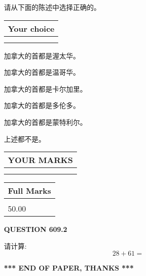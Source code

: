 \documentclass{ctexart}
\begin{document}
  
请从下面的陈述中选择正确的。
  
  
\noindent\hspace{3.0in} \begin{tabular}{|l|}
\hline
Your choice \\
\hline
 \\ 
 \\ 
\hline
\end{tabular}
  
  
 
 
加拿大的首都是渥太华。
 
 
加拿大的首都是温哥华。
 
 
加拿大的首都是卡尔加里。
 
 
加拿大的首都是多伦多。
 
 
加拿大的首都是蒙特利尔。
 
 
 上述都不是。
 
 
  
\vspace{0.2in}
  
\noindent\begin{tabular}{|l|}
\hline
 YOUR MARKS  \\
\hline
 \\ 
 \\ 
\hline
\end{tabular}
\hspace{0.05in} \begin{tabular}{|l|}
\hline
 Full Marks  \\
\hline
 \\ 
50.00 \\
\hline
\end{tabular}
{\textbf{\Large{QUESTION
609.2 
}}}
  
  
 
请计算:
\begin{equation}
28 +  %
61 = \nonumber
\end{equation}
 

 

 
   
   
 \vspace{0.2in}
 
   
   
   
   
\vspace{1.0in} 
{\textbf{\large{ *** END OF PAPER, THANKS *** }}} 
   
\end{document}
